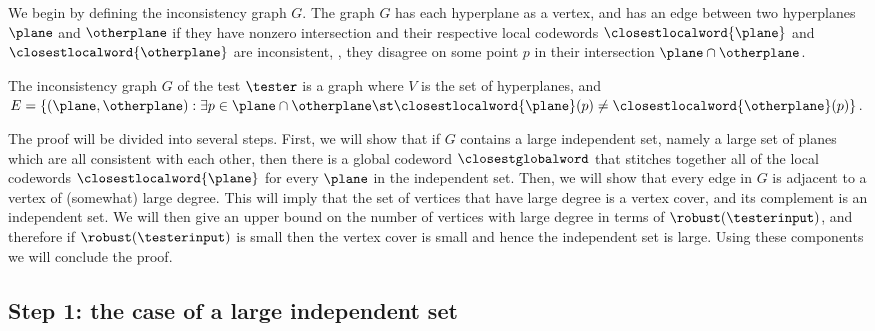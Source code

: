 \documentclass{toc}
\theoremstyle{plain}
\begin{document}
We begin by defining the inconsistency graph $G$. The graph $G$ has each hyperplane as a vertex, and has an edge between two hyperplanes $\plane$ and $\otherplane$ if they have nonzero intersection and their respective local codewords $\closestlocalword{\plane}$ and $\closestlocalword{\otherplane}$ are inconsistent, \ie, they disagree on some point $p$ in their intersection $\plane \cap \otherplane$.

%
\begin{definition}\label{def:graph}
The inconsistency graph $G$ of the test $\tester$ is a graph where $V$ is the set of hyperplanes, and $E = \{(\plane, \otherplane) : \exists p \in \plane \cap \otherplane \st \closestlocalword{\plane}(p) \ne \closestlocalword{\otherplane}(p)\}$.
\end{definition}
%

The proof will be divided into several steps. First, we will show that if $G$ contains a large independent set, namely a large set of planes which are all consistent with each other, then there is a global codeword $\closestglobalword$ that stitches together all of the local codewords $\closestlocalword{\plane}$ for every $\plane$ in the independent set. Then, we will show that every edge in $G$ is adjacent to a vertex of (somewhat) large degree. This will imply that the set of vertices that have large degree is a vertex cover, and its complement is an independent set.
We will then
%
give an upper bound on  %
the number of vertices with large degree in terms of $\robust(\testerinput)$, and therefore if $\robust(\testerinput)$ is small then the vertex cover is small and hence the independent set is large.
Using these components we will conclude the proof.

%
%
\subsection{Step 1: the case of a large independent set}
\end{document}
